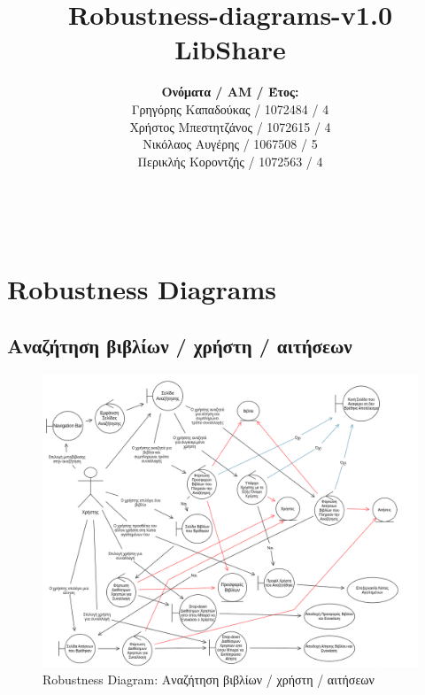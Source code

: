 \documentclass[12pt,a4paper]{article}
\title{Robustness-diagrams-v1.0 \\ LibShare}
\author{\textbf{Ονόματα / ΑΜ / Έτος:} \\ Γρηγόρης Καπαδούκας / 1072484 / 4\textdegree \\ Χρήστος Μπεστητζάνος / 1072615 / 4\textdegree \\ Νικόλαος Αυγέρης / 1067508 / 5\textdegree \\ Περικλής Κοροντζής / 1072563 / 4\textdegree}
\begin{document}
\makeatletter
\begin{center}
	\LARGE{\@title} \\
	\pagebreak
    \begin{LARGE}\@author\end{LARGE}
    \pagebreak
\end{center}

\section{Robustness Diagrams}

\subsection{Αναζήτηση βιβλίων / χρήστη / αιτήσεων}
\begin{figure}[H]
	\includegraphics[width=\textwidth]{Search Robustness.png}
	\caption{Robustness Diagram: Αναζήτηση βιβλίων / χρήστη / αιτήσεων}
	\label{Robustness Diagram: Αναζήτηση βιβλίων / χρήστη / αιτήσεων}
\end{figure}
\end{document}

